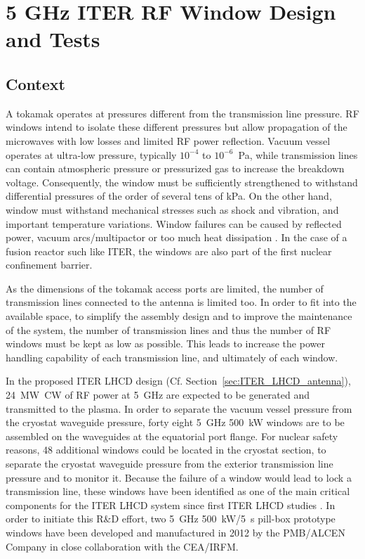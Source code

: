 \clearpage
\section{5 GHz ITER RF Window Design and Tests}\label{sec:RF_windows}
\subsection{Context}
A tokamak operates at pressures different from the transmission line pressure. RF windows intend to isolate these different pressures but allow propagation of the microwaves with low losses and limited RF power reflection. Vacuum vessel operates at ultra-low pressure, typically $10^{-4}$ to $10^{-6}$~\si{Pa}, while transmission lines can contain atmospheric pressure or pressurized gas to increase the breakdown voltage. Consequently, the window must be sufficiently strengthened to withstand differential pressures of the order of several tens of \si{kPa}. On the other hand, window must withstand mechanical stresses such as shock and vibration, and important temperature variations. Window failures can be caused by reflected power, vacuum arcs/multipactor or too much heat dissipation . In the case of a fusion reactor such like ITER, the windows are also part of the first nuclear confinement barrier.

As the dimensions of the tokamak access ports are limited, the number of transmission lines connected to the antenna is limited too. In order to fit into the available space, to simplify the assembly design and to improve the maintenance of the system, the number of transmission lines and thus the number of RF windows must be kept as low as possible. This leads to increase the power handling capability of each transmission line, and ultimately of each window.

In the proposed ITER LHCD design (Cf. Section~\ref{sec:ITER_LHCD_antenna}), 24~\si{MW}~CW of RF power at 5~\si{GHz} are expected to be generated and transmitted to the plasma. In order to separate the vacuum vessel pressure from the cryostat waveguide pressure, forty eight 5~\si{GHz} 500~\si{kW} windows are to be assembled on the waveguides at the equatorial port flange. For nuclear safety reasons, 48 additional windows could be located in the cryostat section, to separate the cryostat waveguide pressure from the exterior transmission line pressure and to monitor it. Because the failure of a window would lead to lock a transmission line, these windows have been identified as one of the main critical components for the ITER LHCD system since first ITER LHCD studies . In order to initiate this R\&D effort, two 5~\si{GHz} 500~\si{kW}/5~s pill-box prototype windows have been developed and manufactured in 2012 by the PMB/ALCEN Company in close collaboration with the CEA/IRFM. 

